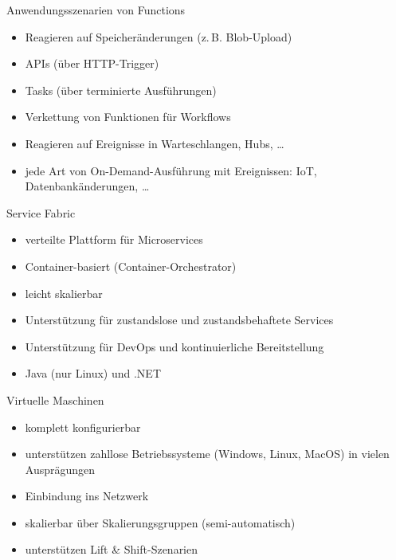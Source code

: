 \begin{flashcard}[]{Anwendungsszenarien von Functions}
  \begin{itemize}
    \item Reagieren auf Speicheränderungen (z.\,B. Blob-Upload)
    \item APIs (über HTTP-Trigger)
    \item Tasks (über terminierte Ausführungen)
    \item Verkettung von Funktionen für Workflows
    \item Reagieren auf Ereignisse in Warteschlangen, Hubs, \ldots
    \item jede Art von On-Demand-Ausführung mit Ereignissen: IoT, Datenbankänderungen, \ldots
  \end{itemize}
\end{flashcard}

\begin{flashcard}[]{Service Fabric}
  \begin{itemize}
    \item verteilte Plattform für Microservices
    \item Container-basiert (Container-Orchestrator)
    \item leicht skalierbar
    \item Unterstützung für zustandslose und zustandsbehaftete Services
    \item Unterstützung für DevOps und kontinuierliche Bereitstellung
    \item Java (nur Linux) und .NET
  \end{itemize}
\end{flashcard}

\begin{flashcard}[]{Virtuelle Maschinen}
  \begin{itemize}
    \item komplett konfigurierbar
    \item unterstützen zahllose Betriebssysteme (Windows, Linux, MacOS) in vielen Ausprägungen
    \item Einbindung ins Netzwerk
    \item skalierbar über Skalierungsgruppen (semi-automatisch)
    \item unterstützen Lift \& Shift-Szenarien
  \end{itemize}
\end{flashcard}

